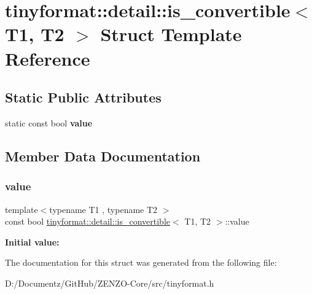 \hypertarget{structtinyformat_1_1detail_1_1is__convertible}{}\section{tinyformat\+::detail\+::is\+\_\+convertible$<$ T1, T2 $>$ Struct Template Reference}
\label{structtinyformat_1_1detail_1_1is__convertible}
\subsection*{Static Public Attributes}
\begin{DoxyCompactItemize}
\item 
static const bool {\bfseries value}
\end{DoxyCompactItemize}


\subsection{Member Data Documentation}
\mbox{\label{structtinyformat_1_1detail_1_1is__convertible_a399ca4333bd68f88a5d5a2430f804df2}} 
\subsubsection{\texorpdfstring{value}{value}}
{\footnotesize\ttfamily template$<$typename T1 , typename T2 $>$ \\
const bool \mbox{\hyperlink{structtinyformat_1_1detail_1_1is__convertible}{tinyformat\+::detail\+::is\+\_\+convertible}}$<$ T1, T2 $>$\+::value\hspace{0.3cm}{\ttfamily [static]}}

{\bfseries Initial value\+:}
\begin{DoxyCode}{0}
\DoxyCodeLine{=}

\end{DoxyCode}


The documentation for this struct was generated from the following file\+:\begin{DoxyCompactItemize}
\item 
D\+:/\+Documentz/\+Git\+Hub/\+Z\+E\+N\+Z\+O-\/\+Core/src/tinyformat.\+h\end{DoxyCompactItemize}
